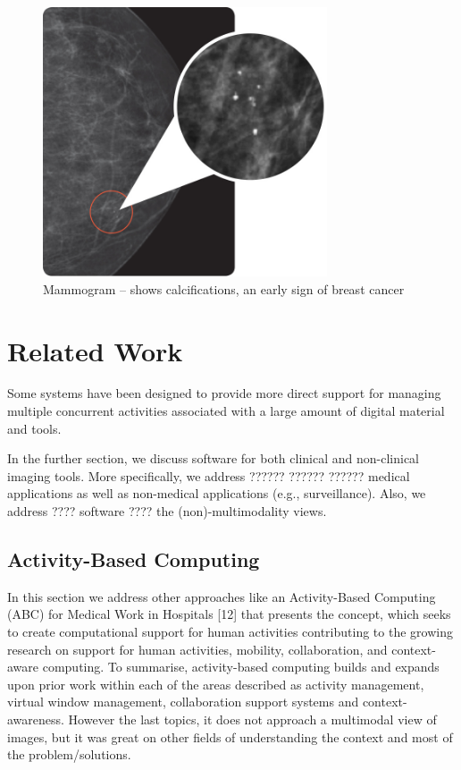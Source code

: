\begin{figure}[!hbt]
\centering
\includegraphics[width=0.75\textwidth]{calcifications.png}
\caption{\label{fig:frog}Mammogram – shows calcifications, an early sign of breast cancer
}
\end{figure}

\clearpage

\section{Related Work}

Some systems have been designed to provide more direct support for managing multiple concurrent activities associated with a large amount of digital material and tools.

In the further section, we discuss software for both clinical and non-clinical imaging tools. More specifically, we address ?????? ?????? ?????? medical applications as well as non-medical applications (e.g., surveillance). Also, we address ???? software ???? the (non)-multimodality views.

\subsection{Activity-Based Computing}

In this section we address other approaches like an Activity-Based Computing (ABC) for Medical Work in Hospitals [12] that presents the concept, which seeks to create computational support for human activities contributing to the growing research on support for human activities, mobility, collaboration, and context-aware computing. To summarise, activity-based computing builds and expands upon prior work within each of the areas described as activity management, virtual window management, collaboration support systems and context-awareness. However the last topics, it does not approach a multimodal view of images, but it was great on other fields of understanding the context and most of the problem/solutions.

